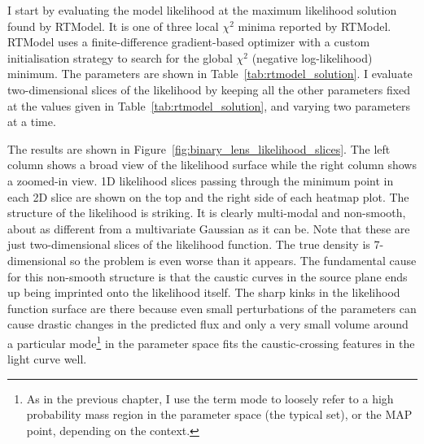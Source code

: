 \documentclass[12pt,dvipsnames]{report}
\begin{document}
I start by evaluating the model likelihood at the maximum likelihood solution found 
by RTModel. It is one of three local $\chi^2$ minima reported by RTModel. RTModel 
uses a finite-difference gradient-based optimizer with a custom initialisation strategy 
to search for the global $\chi^2$ (negative log-likelihood) minimum. 
The parameters are shown in Table~\ref{tab:rtmodel_solution}. I evaluate two-dimensional 
slices of the likelihood by keeping all the other parameters fixed at the values 
given in Table~\ref{tab:rtmodel_solution}, and varying two parameters at a time.

The results are shown in Figure~\ref{fig:binary_lens_likelihood_slices}. The left column 
shows a broad view of the likelihood surface while the right column shows a zoomed-in view.
1D likelihood slices passing through the minimum point in each 2D slice are shown 
on the top and the right side of each heatmap plot.
The structure of the likelihood is striking. It is clearly multi-modal and non-smooth,
about as different from a multivariate Gaussian as it can be. Note that  
these are just two-dimensional slices of the likelihood function. The true density
is 7-dimensional so the problem is even worse than it appears.
The fundamental cause for this non-smooth structure is that the caustic curves in the source 
plane ends up being imprinted onto the likelihood itself. The sharp kinks in the likelihood 
function surface are there because even small perturbations of the parameters can cause drastic 
changes in the predicted flux and only a very small volume around a particular mode\footnote{
    As in the previous chapter, I use the term mode to loosely refer to a high probability 
    mass region in the parameter space (the typical set), or the MAP point, depending on 
    the context.} in the parameter space fits the caustic-crossing features in the light 
    curve well.
\end{document}
